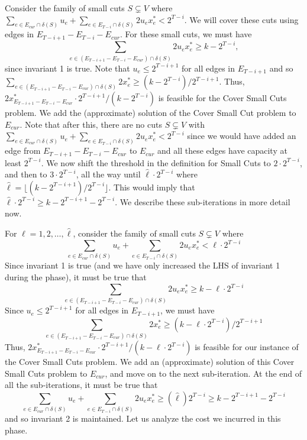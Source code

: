 \documentclass[11pt]{article}
\newcommand{\alphatwo}{2}
\begin{document}
{Consider the family of small cuts $S \subsetneq V$ where $\sum_{e\in E_{cur} \cap \delta(S)}u_e +
\sum_{e\in E_{T-i} \cap \delta(S)} \alphatwo u_ex^*_e < 2^{T-i}$. We will cover these
cuts using edges in $E_{T-i+1}-E_{T-i}-E_{cur}$. For these small cuts, we must have 
$$\sum_{e\in (E_{T-i+1}-E_{T-i}-E_{cur}) \cap \delta(S)}\alphatwo
u_ex^*_e \geq k-2^{T-i},$$ 
since invariant 1 is true. Note that
$u_e \leq 2^{T-i+1}$ for all edges in $E_{T-i+1}$ and so $\sum_{e\in
(E_{T-i+1}-E_{T-i}-E_{cur}) \cap \delta(S)}\alphatwo x^*_e \geq (k-2^{T-i})/2^{T-i+1}$.
Thus, $\alphatwo x^*_{E_{T-i+1}-E_{T-i}-E_{cur}} \cdot 2^{T-i+1}/(k-2^{T-i})$
is feasible for the Cover Small Cuts problem. We add the (approximate)
solution of the Cover Small Cut problem to $E_{cur}$. Note that
after this, there are no cuts $S \subsetneq V$ with $\sum_{e\in E_{cur} \cap \delta(S)}u_e +
\sum_{e\in E_{T-i} \cap \delta(S)} \alphatwo u_ex^*_e < 2^{T-i}$ since we would have
added an edge from $E_{T-i+1}-E_{T-i}-E_{cur}$ to $E_{cur}$ and all
these edges have capacity at least $2^{T-i}$. We now shift the
threshold in the definition for Small Cuts to $2\cdot 2^{T-i}$, and
then to $3\cdot 2^{T-i}$, all the way until $\hat{\ell}\cdot 2^{T-i}$
where $\hat{\ell} = \lfloor (k-2^{T-i+1})/2^{T-i} \rfloor$. This
would imply that  $\hat{\ell}\cdot2^{T-i}\geq k-2^{T-i+1} - 2^{T-i}$.
We describe these sub-iterations in more detail now.

For $\ell = 1,2,\ldots, \hat{\ell}$, consider the family of small cuts $S \subsetneq V$ where
\[
\sum_{e\in E_{cur} \cap \delta(S)}u_e + \sum_{e\in E_{T-i} \cap \delta(S)} \alphatwo u_ex^*_e < \ell\cdot 2^{T-i} \tag{definition of small cuts}
\]
Since invariant 1 is true (and we have only increased the LHS of
invariant 1 during the phase), it must be true that
\[
\sum_{e\in (E_{T-i+1}-E_{T-i}-E_{cur}) \cap \delta(S)}\alphatwo  u_ex^*_e \geq k-\ell\cdot 2^{T-i}
\]
Since $u_e \leq 2^{T-i+1}$ for all edges in $E_{T-i+1}$, we must have
\[
\sum_{e\in (E_{T-i+1}-E_{T-i}-E_{cur}) \cap \delta(S)}\alphatwo  x^*_e \geq (k-\ell\cdot 2^{T-i})/2^{T-i+1}
\]
Thus, $\alphatwo x^*_{E_{T-i+1}-E_{T-i}-E_{cur}} \cdot 2^{T-i+1}/(k-\ell\cdot
2^{T-i})$ is feasible for our instance of the Cover Small Cuts problem. We add
an (approximate) solution of this Cover Small Cuts problem to
$E_{cur}$, and move on to the next sub-iteration. At the end of all
the sub-iterations, it must be true that
\[
    \sum_{e\in E_{cur} \cap \delta(S)}u_e + \sum_{e\in E_{T-i} \cap \delta(S)}\alphatwo u_ex^*_e \geq (\hat{\ell})2^{T-i} \geq k-2^{T-i+1}-2^{T-i}
\]
and so invariant 2 is maintained. Let us analyze the cost we incurred in this phase.

}
\end{document}
